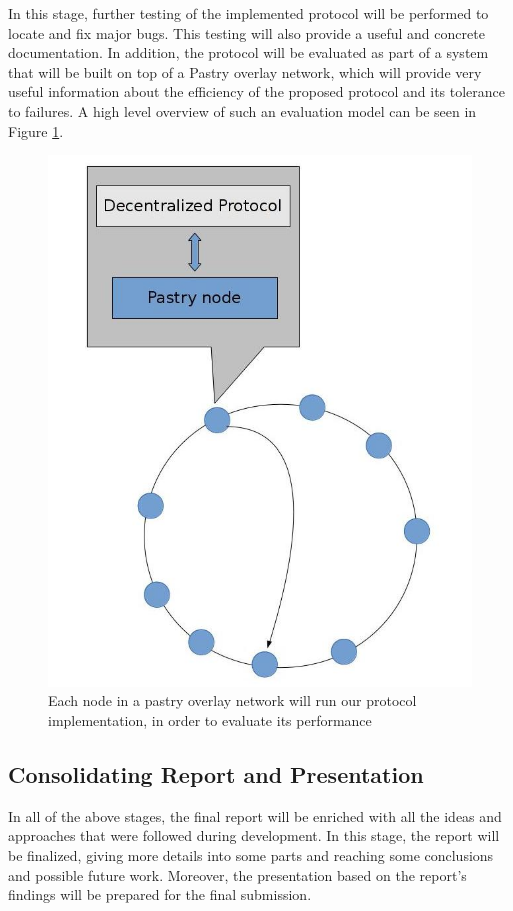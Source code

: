 \documentclass[MSc]{icldt}
\begin{document}
In this stage, further testing of the implemented protocol will be performed to locate and fix major bugs. This testing will also provide a useful and concrete documentation. In addition, the protocol will be evaluated as part of a system that will be built on top of a Pastry overlay network, which will provide very useful information about the efficiency of the proposed protocol and its tolerance to failures. A high level overview of such an evaluation model can be seen in Figure \ref{fig:pastry_evaluation}.

\begin{figure}[!h]
   \centering
     \includegraphics[scale=0.5]{../figures/pastry_evaluation.jpg}
	 \caption{Each node in a pastry overlay network will run our protocol implementation, in order to evaluate its performance}
     \label{fig:pastry_evaluation}
\end{figure}

\subsection*{Consolidating Report and Presentation}

In all of the above stages, the final report will be enriched with all the ideas and approaches that were followed during development. In this stage, the report will be finalized, giving more details into some parts and reaching some conclusions and possible future work. Moreover, the presentation based on the report's findings will be prepared for the final submission.



\end{document}
